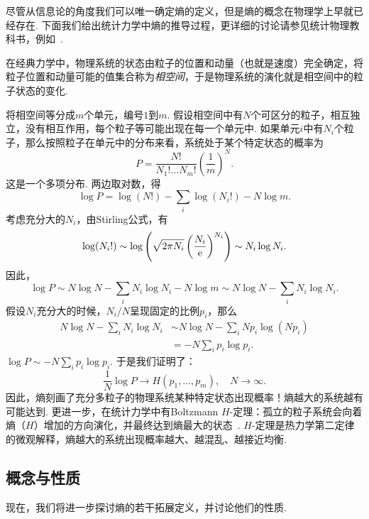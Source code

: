 尽管从信息论的角度我们可以唯一确定熵的定义，但是熵的概念在物理学上早就已经存在. 下面我们给出统计力学中熵的推导过程，更详细的讨论请参见统计物理教科书，例如~\cite{tolmanPrinciplesStatisticalMechanics2010}.

在经典力学中，物理系统的状态由粒子的位置和动量（也就是速度）完全确定，将粒子位置和动量可能的值集合称为\textit{相空间}，于是物理系统的演化就是相空间中的粒子状态的变化. 

将相空间等分成$m$个单元，编号$1$到$m$. 假设相空间中有$N$个可区分的粒子，相互独立，没有相互作用，每个粒子等可能出现在每一个单元中. 如果单元$i$中有$N_i$个粒子，那么按照粒子在单元中的分布来看，系统处于某个特定状态的概率为
    \[P=\frac{N!}{N_1!\dots N_m!}\left(\frac1m\right)^N.\]
这是一个多项分布. 两边取对数，得
    \[\log P=\log(N!)-\sum_i\log(N_i!)-N\log m.\]
考虑充分大的$N_i$，由Stirling公式，有
\begin{align*}
    \log(N_i!)\sim\log\left(\sqrt{2\pi N_i}\left(\frac{N_i}{\mathrm{e}}\right)^{N_i}\right)\sim N_i\log N_i.    
\end{align*}
因此，
\begin{equation}
    \log P\sim N\log N-\sum_i N_i\log N_i- N\log m\sim N\log N-\sum_i N_i\log N_i.\label{eq:logP}
\end{equation}
假设$N_i$充分大的时候，$N_i/N$呈现固定的比例$p_i$，那么
    \begin{align*}
        N\log N-\sum_i N_i\log N_i&\sim N\log N-\sum_i Np_i\log(Np_i)\\
        &=-N\sum_i p_i\log p_i.
    \end{align*}
 $\log P\sim -N\sum_i p_i\log p_i$. 于是我们证明了：
    \[\frac1N\log P\to H(p_1,\dots,p_m),\quad N\to\infty.\]
因此，熵刻画了充分多粒子的物理系统某种特定状态出现概率！熵越大的系统越有可能达到. 更进一步，在统计力学中有Boltzmann $H$-定理：孤立的粒子系统会向着熵（$H$）增加的方向演化，并最终达到熵最大的状态~\cite{uffinkBoltzmannsWorkStatistical2022}. $H$-定理是热力学第二定律的微观解释，熵越大的系统出现概率越大、越混乱、越接近均衡.

\subsection{概念与性质}
现在，我们将进一步探讨熵的若干拓展定义，并讨论他们的性质. 

